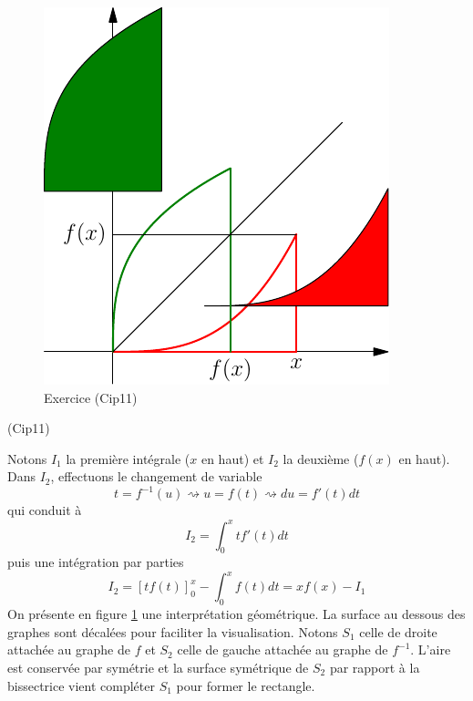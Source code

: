 \begin{figure}[h]
  \centering
  \includegraphics{./Cip11_1.pdf}
  \caption{Exercice \theenumi \hspace{0.5cm }(Cip11)}
  \label{fig: Cip11_1}
\end{figure}
\begin{tiny}(Cip11)\end{tiny} Notons $I_1$ la première intégrale ($x$ en haut) et $I_2$ la deuxième ($f(x)$ en haut). Dans $I_2$, effectuons le changement de variable 
\begin{displaymath}
  t = f^{-1}(u)\rightsquigarrow u = f(t) \rightsquigarrow du = f'(t)dt 
\end{displaymath}
qui conduit à
\begin{displaymath}
  I_2 = \int_{0}^{x}tf'(t)dt
\end{displaymath}
puis une intégration par parties
\begin{displaymath}
  I_2 = \left[tf(t) \right]_{0}^{x}-\int_{0}^{x}f(t)dt = xf(x) - I_1
\end{displaymath}
On présente en figure \ref{fig: Cip11_1} une interprétation géométrique. La surface au dessous des graphes sont décalées pour faciliter la visualisation. Notons $S_1$ celle de droite attachée au graphe de $f$ et $S_2$ celle de gauche attachée au graphe de $f^{-1}$. L'aire est conservée par symétrie et la surface symétrique de $S_2$ par rapport à la bissectrice vient compléter $S_1$ pour former le rectangle.
